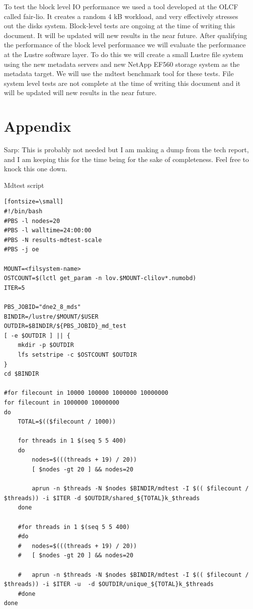 \documentclass[conference,compsoc]{IEEEtran}
\begin{document}
To test the block level IO performance we used a tool developed at the OLCF
called fair-lio. It creates a random 4 kB workload, and very effectively
stresses out the disks system. Block-level tests are ongoing at the time of
writing this document. It will be updated will new results in the near future.
After qualifying the performance of the block level performance we will
evaluate the performance at the Lustre software layer. To do this we will
create a small Lustre file system using the new metadata servers and new NetApp
EF560 storage system as the metadata target. We will use the mdtest benchmark
tool for these tests. File system level tests are not complete at the time of
writing this document and it will be updated will new results in the near
future.

\section*{Appendix}

Sarp: This is probably not needed but I am making a dump from the tech report, and I am keeping this for the time being for the sake of completeness. Feel free to knock this one down.

Mdtest script

\begin{verbatim}[fontsize=\small]
#!/bin/bash
#PBS -l nodes=20
#PBS -l walltime=24:00:00
#PBS -N results-mdtest-scale
#PBS -j oe

MOUNT=<filsystem-name>
OSTCOUNT=$(lctl get_param -n lov.$MOUNT-clilov*.numobd)
ITER=5

PBS_JOBID="dne2_8_mds"
BINDIR=/lustre/$MOUNT/$USER
OUTDIR=$BINDIR/${PBS_JOBID}_md_test
[ -e $OUTDIR ] || {
	mkdir -p $OUTDIR
	lfs setstripe -c $OSTCOUNT $OUTDIR
}
cd $BINDIR

#for filecount in 10000 100000 1000000 10000000
for filecount in 1000000 10000000
do
	TOTAL=$(($filecount / 1000))

	for threads in 1 $(seq 5 5 400)
	do
		nodes=$(((threads + 19) / 20))
		[ $nodes -gt 20 ] && nodes=20

		aprun -n $threads -N $nodes $BINDIR/mdtest -I $(( $filecount / $threads)) -i $ITER -d $OUTDIR/shared_${TOTAL}k_$threads
	done

	#for threads in 1 $(seq 5 5 400)
	#do
	#	nodes=$(((threads + 19) / 20))
	#	[ $nodes -gt 20 ] && nodes=20

	#	aprun -n $threads -N $nodes $BINDIR/mdtest -I $(( $filecount / $threads)) -i $ITER -u  -d $OUTDIR/unique_${TOTAL}k_$threads
	#done
done
\end{verbatim}
\end{document}
